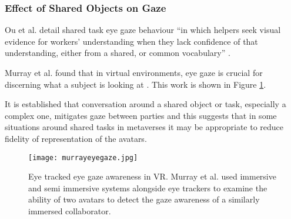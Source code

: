 \subsubsection{Effect of Shared Objects on Gaze}
Ou et al. detail shared task eye gaze behaviour ``in which helpers seek visual evidence for workers' understanding when they lack confidence of that understanding, either from a shared, or common vocabulary'' \cite{Ou2005}.\par 
  Murray et al. found that in virtual environments, eye gaze is crucial for discerning what a subject is looking at \cite{Murray2009}. This work is shown in Figure \ref{fig:murrayeyegaze}.\par
It is established that conversation around a shared object or task, especially a complex one, mitigates gaze between parties \cite{Argyle1976} and this suggests that in some situations around shared tasks in metaverses it may be appropriate to reduce fidelity of representation of the avatars. \par
\begin{figure}[!h]
\texttt{[image: murrayeyegaze.jpg]}
\caption{Eye tracked eye gaze awareness in VR. Murray et al. used immersive and semi immersive systems alongside eye trackers to examine the ability of two avatars to detect the gaze awareness of a similarly immersed collaborator.}
\label{fig:murrayeyegaze}
\end{figure}                                       

